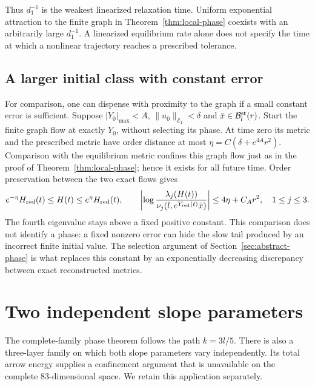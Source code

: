 \documentclass[11pt]{amsart}
\theoremstyle{definition}
\theoremstyle{remark}
\begin{document}
Thus $d_1^{-1}$ is the weakest linearized relaxation time.
Uniform exponential attraction to the finite graph in
Theorem~\ref{thm:local-phase} coexists with an arbitrarily large
$d_1^{-1}$. A linearized equilibrium rate alone does not specify
the time at which a nonlinear trajectory reaches a prescribed
tolerance.

\subsection{A larger initial class with constant error}
For comparison, one can dispense with proximity to the graph
if a small constant error is sufficient. Suppose
$|Y_0|_{\max}<A$, $\|u_0\|_{\mathcal E_1}<\delta$ and
$\bar x\in\mathcal B_l^{\rm st}(r)$. Start the finite graph flow
at exactly $Y_0$, without selecting its phase. At time zero its
metric and the prescribed metric have order distance at most
$\eta=C(\delta+e^{4A}r^2)$. Comparison with the equilibrium metric
confines this graph flow just as in the proof of
Theorem~\ref{thm:local-phase}; hence it exists for all future time.
Order preservation between the two exact flows gives
\[
 e^{-\eta}H_{\rm red}(t)\le H(t)\le e^\eta H_{\rm red}(t),
 \qquad
 \left|\log\frac{\lambda_j(H(t))}
                       {\nu_j(l,e^{Y_{\rm red}(t)}\bar x)}\right|
 \le4\eta+C_Ar^2,\quad 1\le j\le3.
\]
The fourth eigenvalue stays above a fixed positive constant.
This comparison does not identify a phase: a fixed nonzero error
can hide the slow tail produced by an incorrect finite initial value.
The selection argument of Section~\ref{sec:abstract-phase} is what
replaces this constant by an exponentially decreasing discrepancy
between exact reconstructed metrics.

\section{Two independent slope parameters}\label{sec:diamond}

The complete-family phase theorem follows the path $k=3l/5$.
There is also a three-layer family on which both slope parameters
vary independently. Its total arrow energy supplies a confinement
argument that is unavailable on the complete 83-dimensional space.
We retain this application separately.
\end{document}
